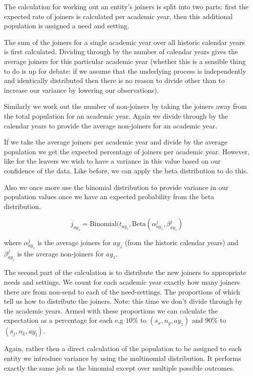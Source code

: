 \documentclass[margin=5mm]{article}
\begin{document}
The calculation for working out an entity's joiners is split into two
parts: first the expected rate of joiners is calculated per academic
year, then this additional population is assigned a need and setting.

The sum of the joiners for a single academic year over all historic
calendar years is first calculated.  Dividing through by the number of
calendar years gives the average joiners for this particular academic
year (whether this is a sensible thing to do is up for debate: if we
assume that the underlying process is independently and identically
distributed then there is no reason to divide other than to increase
our variance by lowering our observations).

Similarly we work out the number of non-joiners by taking the
joiners away from the total population for an academic year.  Again we
divide through by the calendar years to provide the average
non-joiners for an academic year.

If we take the average joiners per academic year and divide by the
average population we get the expected percentage of joiners per
academic year.  However, like for the leavers we wish to have a
variance in this value based on our confidence of the data.  Like
before, we can apply the beta distribution to do this.

Also we once more use the binomial distribution to provide variance in
our population values once we have an expected probability from the
beta distribution.

\begin{equation*}
j_{ay_z} = \text{Binomial}(t_{ay_z}, \text{Beta}(\alpha^j_{ay_z},\beta^j_{ay_z})
\end{equation*}

where $\alpha^j_{ay_z}$ is the average joiners for $ay_z$ (from the
historic calendar years) and $\beta^j_{ay_z}$ is the average
non-joiners for $ay_z$.

The second part of the calculation is to distribute the new joiners to
appropriate needs and settings.  We count for each academic year
exactly how many joiners there are from non-send to each of the
need-settings.  The proportions of which tell us how to distribute the
joiners.  Note: this time we don't divide through by the academic
years.  Armed with these proportions we can calculate the expectation
as a percentage for each e.g $10\%$ to $(s_x,n_y,ay_z)$ and $90\%$ to
$(s_j,n_k,ay_l)$.

Again, rather then a direct calculation of the population to be
assigned to each entity we introduce variance by using the multinomial
distribution.  It performs exactly the same job as the binomial except
over multiple possible outcomes.
\end{document}
